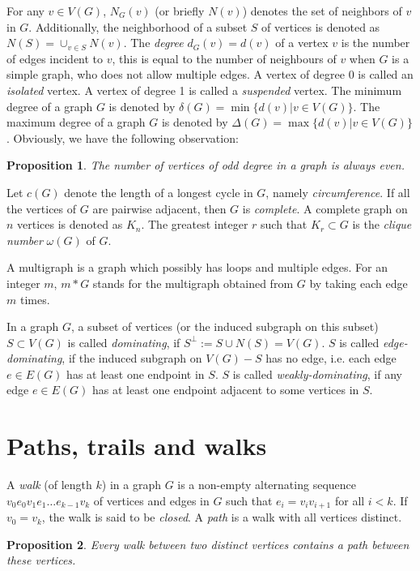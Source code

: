 \documentclass[12pt]{report}
\newtheorem{proposition}{Proposition}
\begin{document}
For any $v\in V(G)$, $N_G(v)$ (or briefly $N(v)$) denotes the set of neighbors of $v$ in $G$. Additionally, the neighborhood of a subset $S$ of vertices is denoted as $N(S)=\cup_{v\in S}N(v)$.
The {\em degree} $d_G(v)=d(v)$ of a vertex $v$ is the number of edges incident to $v$, this is equal to the number of neighbours of $v$ when $G$ is a simple graph, who does not allow multiple edges.
A vertex of degree 0 is called an {\em isolated} vertex. A vertex of degree 1 is called a {\em suspended} vertex. The minimum degree of a graph $G$ is denoted by $\delta(G)=\min\{d(v)|v\in V(G)\}$. The maximum degree of a graph $G$ is denoted by $\Delta(G)=\max\{d(v)|v\in V(G)\}$.
Obviously, we have the following observation:
\begin{proposition}
The number of vertices of odd degree in a graph is always even.
\end{proposition}
Let $c(G)$ denote the length of a longest cycle in $G$, namely {\em circumference}.
If all the vertices of $G$ are pairwise adjacent, then $G$ is {\em complete}. A complete graph on $n$ vertices is denoted as $K_n$.
The greatest integer $r$ such that $K_r\subset G$ is the {\em clique number} $\omega(G)$ of $G$. 




A multigraph is a graph which possibly has loops and multiple edges.
For an integer $m$, $m*G$ stands for the multigraph obtained from $G$ by taking each edge $m$ times.

In a graph $G$, a subset of vertices (or the induced subgraph on this subset) $S\subset V(G)$ is called {\em dominating}, if $S^{\perp}:=S\cup N(S)=V(G)$. 
$S$ is called {\em edge-dominating}, if the induced subgraph on $V(G)-S$ has no edge, i.e. each edge $e\in E(G)$ has at least one endpoint in $S$.
$S$ is called {\em weakly-dominating}, if any edge $e\in E(G)$ has at least one endpoint adjacent to some vertices in $S$.


\section{Paths, trails and walks}

A {\em walk} (of length $k$) in a graph $G$ is a non-empty alternating sequence $v_0e_0v_1e_1\ldots e_{k-1}v_k$ of vertices and edges in $G$ such that $e_i=v_iv_{i+1}$ for all $i<k$. If $v_0=v_k$, the walk is said to be {\em closed}. A {\em path} is a walk with all vertices distinct. 
\begin{proposition}
Every walk between two distinct vertices contains a path between these vertices.
\end{proposition}
\end{document}
